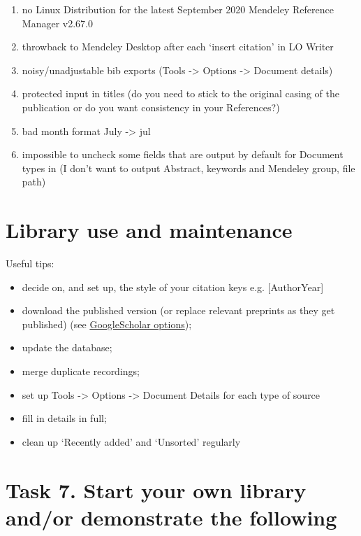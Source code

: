 \documentclass[a4paper,11pt]{article}
\begin{document}
\begin{tcolorbox}[width=\textwidth, nobeforeafter,valign=center, fonttitle=\Large\bfseries,title=My current issues with Mendeley]
	\begin{enumerate}
		\item no Linux Distribution for the latest September 2020 Mendeley Reference Manager v2.67.0
		\item throwback to Mendeley Desktop after each `insert citation' in LO Writer
		\item noisy/unadjustable bib exports (Tools -> Options -> Document details)
		\item protected input in titles (do you need to stick to the original casing of the publication or do you want consistency in your References?)
		\item bad month format July -> jul
		\item impossible to uncheck some fields that are output by default for Document types in (I don't want to output Abstract, keywords and Mendeley group, file path)
	\end{enumerate}
\end{tcolorbox}

\section{Library use and maintenance}

Useful tips: 

\begin{itemize}
	\item decide on, and set up, the style of your citation keys e.g. [AuthorYear]
	\item download the published version (or replace relevant preprints as they get published) (see \href{https://scholar.google.com/scholar?hl=en\&as\_sdt=0\%2C5\&q=Controlling+Text+Complexity+in+Neural+Machine+Translation\&btnG=}{GoogleScholar options});
	\item update the database;
	\item merge duplicate recordings;
	\item set up Tools -> Options -> Document Details for each type of source
	\item fill in details in full;
	\item clean up `Recently added' and `Unsorted' regularly 
\end{itemize}


\section*{Task 7. Start your own library and/or demonstrate the following}
\label{task}
\end{document}
